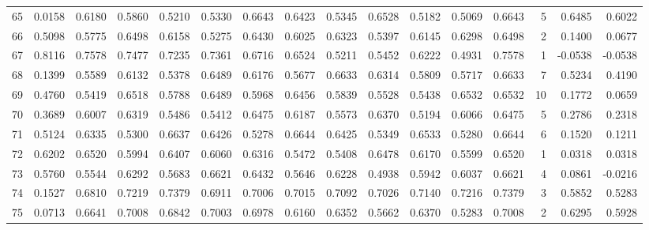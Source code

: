 \begin{tabular}{lrrrrrrrrrrrrrrr}
65  &      0.0158 &  0.6180 &  0.5860 &  0.5210 &  0.5330 &  0.6643 &  0.6423 &  0.5345 &  0.6528 &  0.5182 &   0.5069 &     0.6643 &      5 &                    0.6485 &                     0.6022 \\
66  &      0.5098 &  0.5775 &  0.6498 &  0.6158 &  0.5275 &  0.6430 &  0.6025 &  0.6323 &  0.5397 &  0.6145 &   0.6298 &     0.6498 &      2 &                    0.1400 &                     0.0677 \\
67  &      0.8116 &  0.7578 &  0.7477 &  0.7235 &  0.7361 &  0.6716 &  0.6524 &  0.5211 &  0.5452 &  0.6222 &   0.4931 &     0.7578 &      1 &                   -0.0538 &                    -0.0538 \\
68  &      0.1399 &  0.5589 &  0.6132 &  0.5378 &  0.6489 &  0.6176 &  0.5677 &  0.6633 &  0.6314 &  0.5809 &   0.5717 &     0.6633 &      7 &                    0.5234 &                     0.4190 \\
69  &      0.4760 &  0.5419 &  0.6518 &  0.5788 &  0.6489 &  0.5968 &  0.6456 &  0.5839 &  0.5528 &  0.5438 &   0.6532 &     0.6532 &     10 &                    0.1772 &                     0.0659 \\
70  &      0.3689 &  0.6007 &  0.6319 &  0.5486 &  0.5412 &  0.6475 &  0.6187 &  0.5573 &  0.6370 &  0.5194 &   0.6066 &     0.6475 &      5 &                    0.2786 &                     0.2318 \\
71  &      0.5124 &  0.6335 &  0.5300 &  0.6637 &  0.6426 &  0.5278 &  0.6644 &  0.6425 &  0.5349 &  0.6533 &   0.5280 &     0.6644 &      6 &                    0.1520 &                     0.1211 \\
72  &      0.6202 &  0.6520 &  0.5994 &  0.6407 &  0.6060 &  0.6316 &  0.5472 &  0.5408 &  0.6478 &  0.6170 &   0.5599 &     0.6520 &      1 &                    0.0318 &                     0.0318 \\
73  &      0.5760 &  0.5544 &  0.6292 &  0.5683 &  0.6621 &  0.6432 &  0.5646 &  0.6228 &  0.4938 &  0.5942 &   0.6037 &     0.6621 &      4 &                    0.0861 &                    -0.0216 \\
74  &      0.1527 &  0.6810 &  0.7219 &  0.7379 &  0.6911 &  0.7006 &  0.7015 &  0.7092 &  0.7026 &  0.7140 &   0.7216 &     0.7379 &      3 &                    0.5852 &                     0.5283 \\
75  &      0.0713 &  0.6641 &  0.7008 &  0.6842 &  0.7003 &  0.6978 &  0.6160 &  0.6352 &  0.5662 &  0.6370 &   0.5283 &     0.7008 &      2 &                    0.6295 &                     0.5928 \\

\end{tabular}
